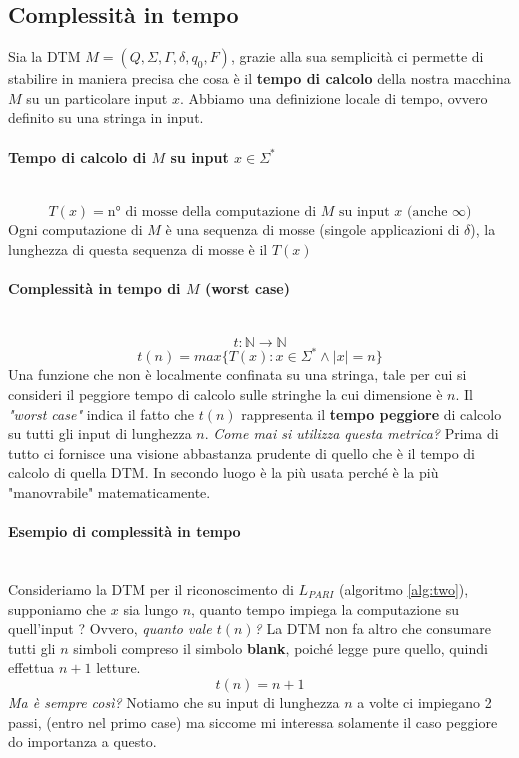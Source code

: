 \documentclass{article}
\begin{document}
\subsection{Complessità in tempo}
Sia la DTM $M=(Q,\Sigma,\Gamma,\delta,q_0,F)$, grazie alla sua semplicità
ci permette di stabilire in maniera precisa che cosa è il \textbf{tempo di calcolo}
della nostra macchina $M$ su un particolare input $x$. Abbiamo una definizione
locale di tempo, ovvero definito su una stringa in input.

\paragraph{Tempo di calcolo di $M$ su input $x\in\Sigma^*$}\mbox{}\\
$$T(x)=\text{n° di mosse della computazione di }M\text{ su input }x\text{ (anche }\infty)$$
Ogni computazione di $M$ è una sequenza di mosse (singole
applicazioni di $\delta$), la lunghezza di questa
sequenza di mosse è il $T(x)$
\paragraph{Complessità in tempo di $M$ (worst case)}\mbox{}\\
$$t:\mathbb{N}\rightarrow\mathbb{N}$$
$$t(n)=max\{T(x):x\in\Sigma^*\land|x|=n\}$$
Una funzione che non è localmente confinata su una stringa, tale per cui
si consideri il peggiore tempo di calcolo sulle stringhe la cui dimensione
è $n$. Il \textit{"worst case"} indica il fatto che $t(n)$ rappresenta il
\textbf{tempo peggiore} di calcolo su tutti gli input di lunghezza $n$.
\textit{Come mai si utilizza questa metrica?} Prima di tutto ci fornisce
una visione abbastanza prudente di quello che è il tempo di calcolo
di quella DTM. In secondo luogo è la più usata perché è la più
"manovrabile" matematicamente.
\paragraph{Esempio di complessità in tempo}\mbox{}\\
Consideriamo la DTM per il riconoscimento di $L_{PARI}$ (algoritmo \ref{alg:two}),
supponiamo che $x$ sia lungo $n$, quanto
tempo impiega la computazione su quell'input ? Ovvero, \textit{quanto vale $t(n)$?}
\newline\newline
La DTM non fa altro che consumare tutti gli $n$ simboli compreso il simbolo \textbf{blank},
poiché legge pure quello, quindi effettua $n+1$ letture.
$$t(n)=n+1$$
\textit{Ma è sempre così?} Notiamo che su input di lunghezza $n$ a volte
ci impiegano 2 passi, (entro nel primo case) ma siccome mi interessa
solamente il caso peggiore do importanza a questo.
\pagebreak
\end{document}
